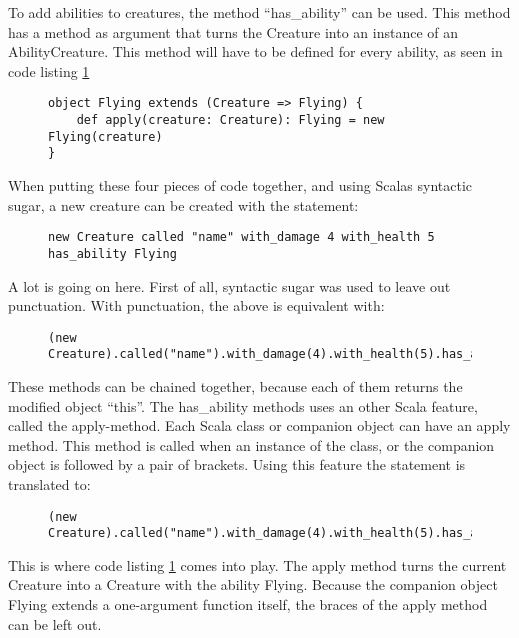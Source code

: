 \documentclass[twocolumn]{phdsymp}
\begin{document}
To add abilities to creatures, the method ``has\_ability'' can be used. This method has a method as argument that turns the Creature into an instance of an AbilityCreature. This method will have to be defined for every ability, as seen in code listing \ref{Code Listing 4}
\begin{figure}[H]
\label{Code Listing 4}
\begin{verbatim}
object Flying extends (Creature => Flying) {
    def apply(creature: Creature): Flying = new Flying(creature)
}
\end{verbatim}
\end{figure}
When putting these four pieces of code together, and using Scalas syntactic sugar, a new creature can be created with the statement:
\begin{figure}[H]
\label{Code Listing 5}
\begin{verbatim}
new Creature called "name" with_damage 4 with_health 5 has_ability Flying
\end{verbatim}
\end{figure}
A lot is going on here. First of all, syntactic sugar was used to leave out punctuation. With punctuation, the above is equivalent with:
\begin{figure}[H]
\label{Code Listing 6}
\begin{verbatim}
(new Creature).called("name").with_damage(4).with_health(5).has_ability(Flying())
\end{verbatim}
\end{figure}
These methods can be chained together, because each of them returns the modified object ``this''. The has\_ability methods uses an other Scala feature, called the apply-method. Each Scala class or companion object can have an apply method. This method is called when an instance of the class, or the companion object is followed by a pair of brackets. Using this feature the statement is translated to:
\begin{figure}[H]
\label{Code Listing 7}
\begin{verbatim}
(new Creature).called("name").with_damage(4).with_health(5).has_ability(Flying.apply())
\end{verbatim}
\end{figure}
This is where code listing \ref{Code Listing 4} comes into play. The apply method turns the current Creature into a Creature with the ability Flying. Because the companion object Flying extends a one-argument function itself, the braces of the apply method can be left out.
\end{document}
